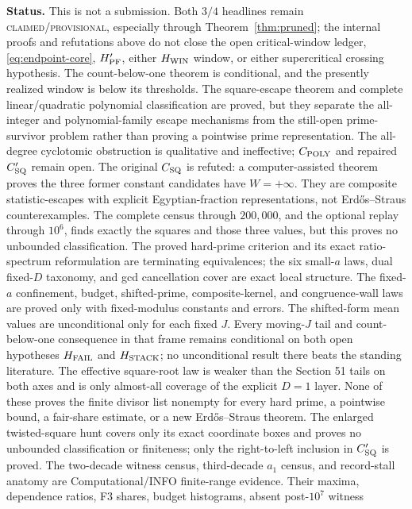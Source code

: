 \documentclass[10pt,reqno]{amsart}
\theoremstyle{definition}
\newcommand{\1}{\mathbf 1}
\begin{document}
\medskip\noindent\textbf{Status.}
This is not a submission.  Both $3/4$ headlines remain
\textsc{claimed/provisional}, especially through Theorem~\ref{thm:pruned};
the internal proofs and refutations above do not close the open
critical-window ledger, \eqref{eq:endpoint-core}, $H_{\rm PF}'$, either
$H_{\rm WIN}$ window, or either supercritical crossing hypothesis.  The
count-below-one theorem is conditional, and the presently realized window
is below its thresholds.  The square-escape theorem and complete
linear/quadratic polynomial classification are proved, but they separate the
all-integer and polynomial-family escape mechanisms from the still-open
prime-survivor problem rather than proving a pointwise prime representation.
The all-degree cyclotomic obstruction is qualitative and ineffective;
$C_{\rm POLY}$ and repaired $C_{\rm SQ}'$ remain open.  The original
$C_{\rm SQ}$ is refuted: a computer-assisted theorem proves the three former
constant candidates have $W=+\infty$.  They are composite statistic-escapes
with explicit Egyptian-fraction representations, not Erd\H{o}s--Straus
counterexamples.  The complete census through $200{,}000$, and the optional
replay through $10^6$, finds exactly the squares and those three values, but
this proves no unbounded classification.  The proved hard-prime criterion and its exact ratio-spectrum
reformulation are terminating equivalences; the six small-$a$ laws, dual
fixed-$D$ taxonomy, and gcd cancellation cover are exact local structure.
The fixed-$a$ confinement, budget, shifted-prime, composite-kernel, and
congruence-wall laws are proved only with fixed-modulus constants and errors.
The shifted-form mean values are unconditional only for each fixed $J$.
Every moving-$J$ tail and count-below-one consequence in that frame remains
conditional on both open hypotheses $H_{\rm FAIL}$ and $H_{\rm STACK}$; no
unconditional result there beats the standing literature.
The effective square-root law is weaker than the Section 51 tails on both
axes and is only almost-all coverage of the explicit $D=1$ layer.  None of
these proves the finite divisor list nonempty for every hard prime, a
pointwise bound, a fair-share estimate, or a new Erd\H{o}s--Straus theorem.
The enlarged twisted-square hunt covers only its exact coordinate boxes and
proves no unbounded classification or finiteness; only the right-to-left
inclusion in $C_{\rm SQ}'$ is proved.  The two-decade witness census, third-decade $a_1$ census, and record-stall
anatomy are Computational/INFO finite-range evidence.  Their maxima,
dependence ratios, F3 shares, budget histograms, absent post-$10^7$ witness
\end{document}
